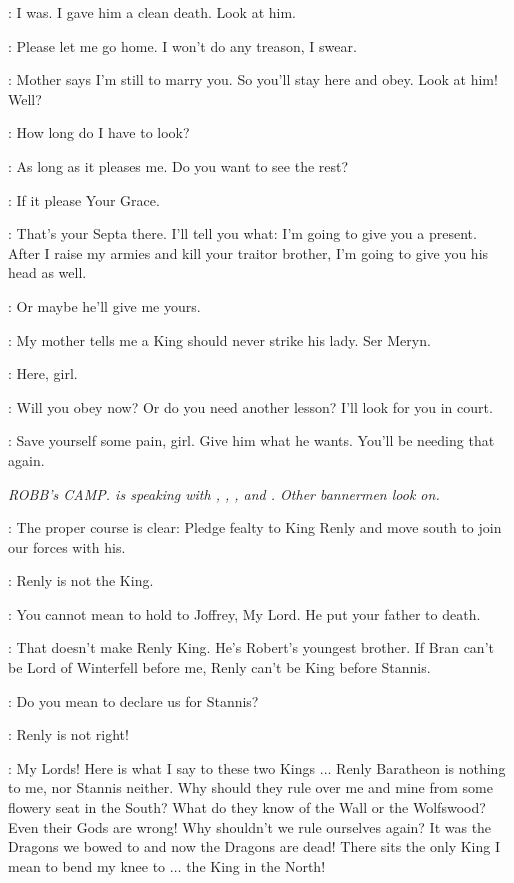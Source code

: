 \JOFFREY: I was. I gave him a clean death. Look at him. 

\SANSA: Please let me go home. I won't do any treason, I swear. 

\JOFFREY: Mother says I'm still to marry you. So you'll stay here and obey. Look at him! Well? 

\SANSA: How long do I have to look? 

\JOFFREY: As long as it pleases me. Do you want to see the rest? 

\SANSA: If it please Your Grace. 

\JOFFREY: That's your Septa there. I'll tell you what: I'm going to give you a present. After I raise my armies and kill your traitor brother, I'm going to give you his head as well. 

\SANSA: Or maybe he'll give me yours. 

\JOFFREY: My mother tells me a King should never strike his lady. Ser Meryn. 


\HOUND: Here, girl. 

\JOFFREY: Will you obey now? Or do you need another lesson? I'll look for you in court. 

\HOUND: Save yourself some pain, girl. Give him what he wants.  You'll be needing that again. 


\scene

\textit{ROBB's CAMP.  \ROBB is speaking with \GLOVER, \UMBER, \BRACKEN, and \THEON. Other bannermen look on.} 

\GLOVER: The proper course is clear: Pledge fealty to King Renly and move south to join our forces with his. 

\ROBB: Renly is not the King. 

\GLOVER: You cannot mean to hold to Joffrey, My Lord. He put your father to death. 

\ROBB: That doesn't make Renly King. He's Robert's youngest brother. If Bran can't be Lord of Winterfell before me, Renly can't be King before Stannis. 

\GLOVER: Do you mean to declare us for Stannis? 

\BRACKEN: Renly is not right! 

\UMBER: My Lords! Here is what I say to these two Kings $\ldots$  Renly Baratheon is nothing to me, nor Stannis neither. Why should they rule over me and mine from some flowery seat in the South? What do they know of the Wall or the Wolfswood? Even their Gods are wrong! Why shouldn't we rule ourselves again? It was the Dragons we bowed to and now the Dragons are dead! There sits the only King I mean to bend my knee to $\ldots$ the King in the North! 

